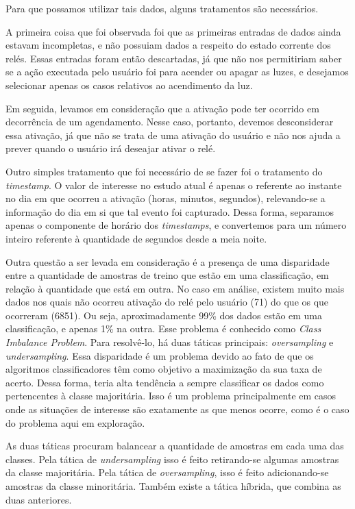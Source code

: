 			Para que possamos utilizar tais dados, alguns tratamentos são necessários.

			A primeira coisa que foi observada foi que as primeiras entradas de dados ainda estavam incompletas, e não possuiam dados a respeito do estado corrente dos relés. Essas entradas foram então descartadas, já que não nos permitiriam saber se a ação executada pelo usuário foi para acender ou apagar as luzes, e desejamos selecionar apenas os casos relativos ao acendimento da luz.

			Em seguida, levamos em consideração que a ativação pode ter ocorrido em decorrência de um agendamento. Nesse caso, portanto, devemos desconsiderar essa ativação, já que não se trata de uma ativação do usuário e não nos ajuda a prever quando o usuário irá deseajar ativar o relé.

			Outro simples tratamento que foi necessário de se fazer foi o tratamento do \emph{timestamp}. O valor de interesse no estudo atual é apenas o referente ao instante no dia em que ocorreu a ativação (horas, minutos, segundos), relevando-se a informação do dia em si que tal evento foi capturado. Dessa forma, separamos apenas o componente de horário dos \emph{timestamps}, e convertemos para um número inteiro referente à quantidade de segundos desde a meia noite.

			Outra questão a ser levada em consideração é a presença de uma disparidade entre a quantidade de amostras de treino que estão em uma classificação, em relação à quantidade que está em outra. No caso em análise, existem muito mais dados nos quais não ocorreu ativação do relé pelo usuário (71) do que os que ocorreram (6851). Ou seja, aproximadamente 99\% dos dados estão em uma classificação, e apenas 1\% na outra. Esse problema é conhecido como \emph{Class Imbalance Problem}. Para resolvê-lo, há duas táticas principais: \emph{oversampling} e \emph{undersampling}. Essa disparidade é um problema devido ao fato de que os algoritmos classificadores têm como objetivo a maximização da sua taxa de acerto. Dessa forma, teria alta tendência a sempre classificar os dados como pertencentes à classe majoritária. Isso é um problema principalmente em casos onde as situações de interesse são exatamente as que menos ocorre, como é o caso do problema aqui em exploração.


			As duas táticas procuram balancear a quantidade de amostras em cada uma das classes. Pela tática de \emph{undersampling} isso é feito retirando-se algumas amostras da classe majoritária. Pela tática de \emph{oversampling}, isso é feito adicionando-se amostras da classe minoritária. Também existe a tática híbrida, que combina as duas anteriores.

